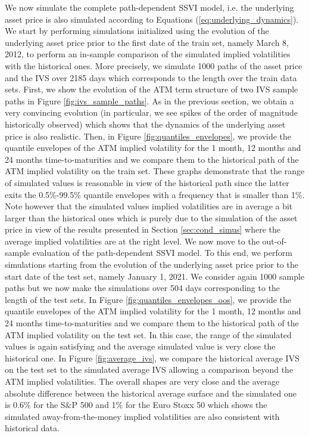 We now simulate the complete path-dependent SSVI model, i.e. the underlying asset price is also simulated according to Equations (\ref{eq:underlying_dynamics}). We start by performing simulations initialized using the evolution of the underlying asset price prior to the first date of the train set, namely March 8, 2012, to perform an in-sample comparison of the simulated implied volatilities with the historical ones. More precisely, we simulate 1000 paths of the asset price and the IVS over 2185 days which corresponds to the length over the train data sets. First, we show the evolution of the ATM term structure of two IVS sample paths in Figure \ref{fig:ivs_sample_paths}. As in the previous section, we obtain a very convincing evolution (in particular, we see spikes of the order of magnitude historically observed) which shows that the dynamics of the underlying asset price is also realistic. Then, in Figure \ref{fig:quantiles_envelopes}, we provide the quantile envelopes of the ATM implied volatility for the 1 month, 12 months and 24 months time-to-maturities and we compare them to the historical path of the ATM implied volatility on the train set. These graphs demonstrate that the range of simulated values is reasonable in view of the historical path since the latter exits the 0.5\%-99.5\% quantile envelopes with a frequency that is smaller than 1\%. Note however that the simulated values implied volatilities are in average a bit larger than the historical ones which is purely due to the simulation of the asset price in view of the results presented in Section \ref{sec:cond_simus} where the average implied volatilities are at the right level. We now move to the out-of-sample evaluation of the path-dependent SSVI model. To this end, we perform simulations starting from the evolution of the underlying asset price prior to the start date of the test set, namely January 1, 2021. We consider again 1000 sample paths but we now make the simulations over 504 days corresponding to the length of the test sets. In Figure \ref{fig:quantiles_envelopes_oos}, we provide the quantile envelopes of the ATM implied volatility for the 1 month, 12 months and 24 months time-to-maturities and we compare them to the historical path of the ATM implied volatility on the test set. In this case, the range of the simulated values is again satisfying and the average simulated value is very close the historical one. In Figure \ref{fig:average_ivs}, we compare the historical average IVS on the test set to the simulated average IVS allowing a comparison beyond the ATM implied volatilities. The overall shapes are very close and the average absolute difference between the historical average surface and the simulated one is 0.6\% for the S\&P 500 and 1\% for the Euro Stoxx 50 which shows the simulated away-from-the-money implied volatilities are also consistent with historical data. \\

